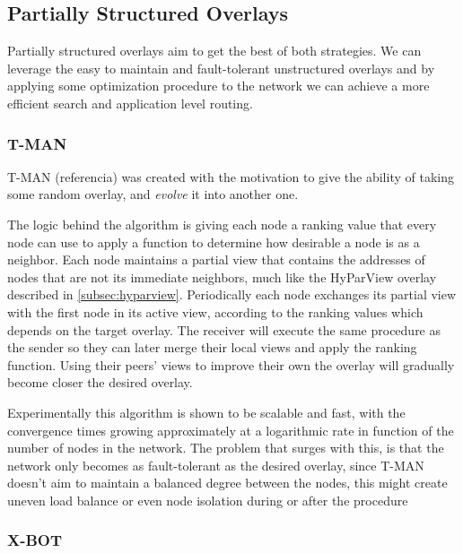 \subsection{Partially Structured Overlays}
\label{sub:partially_structured_overlays}

Partially structured overlays aim to get the best of both strategies. We can 
leverage the easy to maintain and fault-tolerant unstructured overlays and
by applying some optimization procedure to the network we can achieve a more
efficient search and application level routing.

\subsubsection{T-MAN}
\label{subsec:t-man}

T-MAN (referencia) was created with the motivation to give
the ability of taking some random overlay, and \textit{evolve} it into another one.

The logic behind the algorithm is giving each node a ranking value that every node can
use to apply a function to determine how desirable a node is as a neighbor.
Each node maintains a partial view that contains the addresses of nodes that are not its
immediate neighbors, much like the HyParView overlay described in \ref{subsec:hyparview}.
Periodically each node exchanges its partial view with the first node in its active view,
according to the ranking
values which depends on the target overlay. The receiver will execute the same procedure
as the sender so they can later merge their local views and apply the ranking function.
Using their peers' views to improve their own the overlay will gradually become closer
the desired overlay.

Experimentally this algorithm is shown to be scalable and fast, with the convergence
times growing approximately at a logarithmic rate in function of the number of nodes in
the network. The problem that surges with this, is that the network only becomes as 
fault-tolerant as the desired overlay, since T-MAN doesn't aim to maintain a balanced degree
between the nodes, this might create uneven load balance or even node isolation during
or after the procedure

\subsubsection{X-BOT}
\label{subsec:x-bot}

